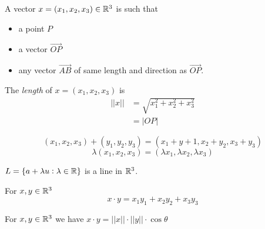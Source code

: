 \documentclass[10pt]{scrartcl}
\begin{document}

A vector  $x = (x_1,x_2,x_3) \in\mathbb{R}^3$ is such that 
\begin{itemize}
\item a point $P$
\item a vector $\vec{OP}$
\item any vector $\vec{AB}$ of same length and direction as $\vec{OP}$.	
\end{itemize}\vspace*{5pt}

\begin{definition}
The \emph{length} of $x = (x_1,x_2,x_3)$ is
\begin{align*}
  ||x|| &= \sqrt{x_1^2 + x_2^2 + x_3^2}\\
  &= |OP|
\end{align*}
\end{definition}

\[
  (x_1,x_2,x_3) + (y_1,y_2,y_3)
  = (x_1+y+1,x_2+y_2,x_3+y_3)
\]
\[
  \lambda(x_1,x_2,x_3) = (\lambda x_1,\lambda x_2, \lambda x_3)
\]



\begin{definition}[Lines of $\R^3$]
$L = \{ a +\lambda u: \lambda \in\mathbb{R}\}$ is a line in $\R^3$.	
\end{definition}


\begin{definition}
For $x,y \in\mathbb{R}^3$\[
  x\cdot y = x_1y_1 + x_2y_2 + x_3y_3\]
\end{definition}

\begin{proposition}
For $x,y\in\mathbb{R}^3$ we have $x \cdot y = ||x|| \cdot||y|| \cdot \cos\theta$ 
\end{proposition}\vspace*{5pt}
\end{document}

